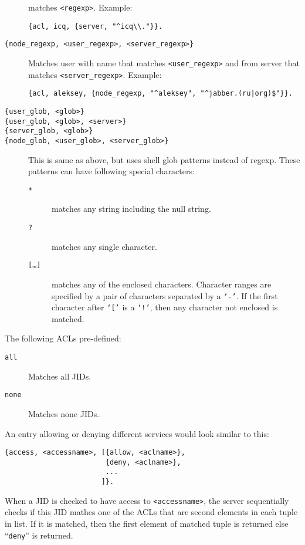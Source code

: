 \documentclass[10pt]{article}
\begin{document}
\begin{description}
  matches \texttt{<regexp>}.  Example:
\begin{verbatim}
{acl, icq, {server, "^icq\\."}}.
\end{verbatim}
\item[\texttt{\{node\_regexp, <user\_regexp>, <server\_regexp>\}}] Matches user
  with name that matches \texttt{<user\_regexp>} and from server that matches
  \texttt{<server\_regexp>}.  Example:
\begin{verbatim}
{acl, aleksey, {node_regexp, "^aleksey", "^jabber.(ru|org)$"}}.
\end{verbatim}
\item[\texttt{\{user\_glob, <glob>\}}]
\item[\texttt{\{user\_glob, <glob>, <server>\}}]
\item[\texttt{\{server\_glob, <glob>\}}]
\item[\texttt{\{node\_glob, <user\_glob>, <server\_glob>\}}] This is same as
  above, but uses shell glob patterns instead of regexp.  These patterns can
  have following special characters:
  \begin{description}
  \item[\texttt{*}] matches any string including the null string.
  \item[\texttt{?}] matches any single character.
  \item[\texttt{[\ldots{}]}] matches any of the enclosed characters.  Character
    ranges are specified by a pair of characters separated by a \texttt{`-'}.
    If the first character after \texttt{`['} is a \texttt{`!'}, then any
    character not enclosed is matched.
  \end{description}
\end{description}

The following ACLs pre-defined:
\begin{description}
\item[\texttt{all}] Matches all JIDs.
\item[\texttt{none}] Matches none JIDs.
\end{description}

An entry allowing or denying different services would look similar to this:
\begin{verbatim}
{access, <accessname>, [{allow, <aclname>},
                        {deny, <aclname>},
                        ...
                       ]}.
\end{verbatim}
When a JID is checked to have access to \texttt{<accessname>}, the server
sequentially checks if this JID mathes one of the ACLs that are second elements
in each tuple in list.  If it is matched, then the first element of matched
tuple is returned else ``\texttt{deny}'' is returned.
\end{document}
